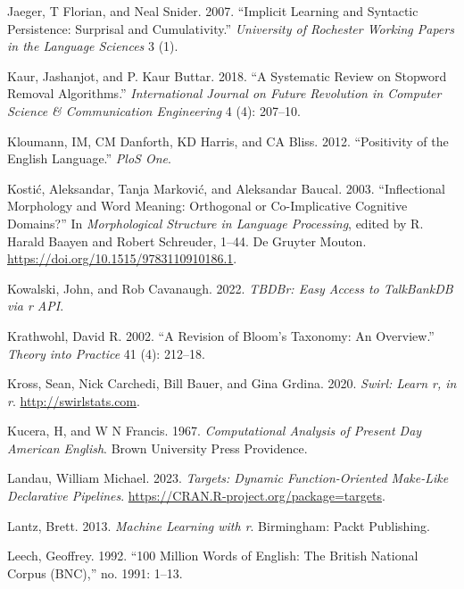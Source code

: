 \documentclass[
  letterpaper,
  DIV=11,
  numbers=noendperiod]{scrreport}
\newlength{\cslhangindent}
\newlength{\cslentryspacingunit} %
\newenvironment{CSLReferences}[2] %
 {%
  \setlength{\parindent}{0pt}
  \ifodd #1
  \let\oldpar\par
  \def\par{\hangindent=\cslhangindent\oldpar}
  \fi
  \setlength{\parskip}{#2\cslentryspacingunit}
 }%
 {}
\theoremstyle{definition}
\theoremstyle{remark}
\begin{document}
\begin{CSLReferences}{1}{0}
\leavevmode{}%
Jaeger, T Florian, and Neal Snider. 2007. {``Implicit Learning and
Syntactic Persistence: Surprisal and Cumulativity.''} \emph{University
of Rochester Working Papers in the Language Sciences} 3 (1).

\leavevmode{}%
Kaur, Jashanjot, and P. Kaur Buttar. 2018. {``A Systematic Review on
Stopword Removal Algorithms.''} \emph{International Journal on Future
Revolution in Computer Science \& Communication Engineering} 4 (4):
207--10.

\leavevmode{}%
Kloumann, IM, CM Danforth, KD Harris, and CA Bliss. 2012. {``Positivity
of the English Language.''} \emph{PloS One}.

\leavevmode{}%
Kostić, Aleksandar, Tanja Marković, and Aleksandar Baucal. 2003.
{``Inflectional Morphology and Word Meaning: Orthogonal or
Co-Implicative Cognitive Domains?''} In \emph{Morphological Structure in
Language Processing}, edited by R. Harald Baayen and Robert Schreuder,
1--44. De Gruyter Mouton. \url{https://doi.org/10.1515/9783110910186.1}.

\leavevmode{}%
Kowalski, John, and Rob Cavanaugh. 2022. \emph{TBDBr: Easy Access to
TalkBankDB via r API}.

\leavevmode{}%
Krathwohl, David R. 2002. {``A Revision of Bloom's Taxonomy: An
Overview.''} \emph{Theory into Practice} 41 (4): 212--18.

\leavevmode{}%
Kross, Sean, Nick Carchedi, Bill Bauer, and Gina Grdina. 2020.
\emph{Swirl: Learn r, in r}. \url{http://swirlstats.com}.

\leavevmode{}%
Kucera, H, and W N Francis. 1967. \emph{Computational Analysis of
Present Day American English}. Brown University Press Providence.

\leavevmode{}%
Landau, William Michael. 2023. \emph{Targets: Dynamic Function-Oriented
Make-Like Declarative Pipelines}.
\url{https://CRAN.R-project.org/package=targets}.

\leavevmode{}%
Lantz, Brett. 2013. \emph{Machine Learning with r}. Birmingham: Packt
Publishing.

\leavevmode{}%
Leech, Geoffrey. 1992. {``100 Million Words of English: The British
National Corpus (BNC),''} no. 1991: 1--13.


\end{CSLReferences}
\end{document}

